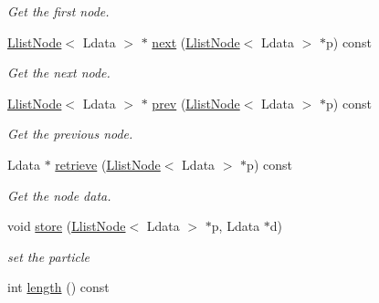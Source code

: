 \begin{CompactItemize}
\begin{CompactList}\small\item\em Get the first node. \item\end{CompactList}\item 
\hypertarget{classLlist_db32667fa0f00bd82d0c1c08c5998fc9}{
\hyperlink{classLlistNode}{LlistNode}$<$ Ldata $>$ $\ast$ \hyperlink{classLlist_db32667fa0f00bd82d0c1c08c5998fc9}{next} (\hyperlink{classLlistNode}{LlistNode}$<$ Ldata $>$ $\ast$p) const }
\label{classLlist_db32667fa0f00bd82d0c1c08c5998fc9}

\begin{CompactList}\small\item\em Get the next node. \item\end{CompactList}\item 
\hypertarget{classLlist_367d32016c163108d10064afafd52029}{
\hyperlink{classLlistNode}{LlistNode}$<$ Ldata $>$ $\ast$ \hyperlink{classLlist_367d32016c163108d10064afafd52029}{prev} (\hyperlink{classLlistNode}{LlistNode}$<$ Ldata $>$ $\ast$p) const }
\label{classLlist_367d32016c163108d10064afafd52029}

\begin{CompactList}\small\item\em Get the previous node. \item\end{CompactList}\item 
\hypertarget{classLlist_67608f0f66a3def622134d074294585d}{
Ldata $\ast$ \hyperlink{classLlist_67608f0f66a3def622134d074294585d}{retrieve} (\hyperlink{classLlistNode}{LlistNode}$<$ Ldata $>$ $\ast$p) const }
\label{classLlist_67608f0f66a3def622134d074294585d}

\begin{CompactList}\small\item\em Get the node data. \item\end{CompactList}\item 
\hypertarget{classLlist_99cb4c4f9cbf48a6b1c2cdae4f366097}{
void \hyperlink{classLlist_99cb4c4f9cbf48a6b1c2cdae4f366097}{store} (\hyperlink{classLlistNode}{LlistNode}$<$ Ldata $>$ $\ast$p, Ldata $\ast$d)}
\label{classLlist_99cb4c4f9cbf48a6b1c2cdae4f366097}

\begin{CompactList}\small\item\em set the particle \item\end{CompactList}\item 
\hypertarget{classLlist_52e0c9e8af720fc20a70fcd159bae5c6}{
int \hyperlink{classLlist_52e0c9e8af720fc20a70fcd159bae5c6}{length} () const }
\label{classLlist_52e0c9e8af720fc20a70fcd159bae5c6}


\end{CompactItemize}
